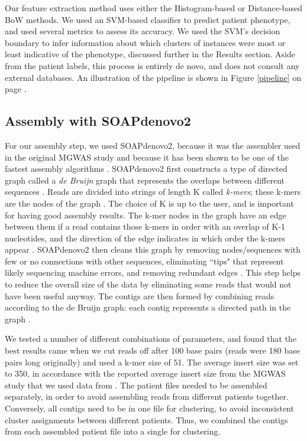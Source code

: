 Our feature extraction method uses either the Histogram-based or Distance-based BoW methods. We used an SVM-based classifier to predict patient phenotype, and used several metrics to assess its accuracy. We used the SVM's decision boundary to infer information about which clusters of instances were most or least indicative of the phenotype, discussed further in the Results section. Aside from the patient labels, this process is entirely de novo, and does not consult any external databases. An illustration of the pipeline is shown in Figure \ref{pipeline} on page \pageref{pipeline}.

\subsection{Assembly with SOAPdenovo2}

For our assembly step, we used SOAPdenovo2, because it was the assembler used in the original MGWAS study \cite{qin041012} and because it has been shown to be one of the fastest assembly algorithms \cite{peng12}. SOAPdenovo2 first constructs a type of directed graph called a \emph{de Bruijn} graph that represents the overlaps between different sequences \cite{li10}. Reads are divided into strings of length K called \emph{k-mers}; these k-mers are the nodes of the graph \cite{zerbino08}. The choice of K is up to the user, and is important for having good assembly results. The k-mer nodes in the graph have an edge between them if a read contains those k-mers in order with an overlap of K-1 nucleotides, and the direction of the edge indicates in which order the k-mers appear \cite{zerbino08}. SOAPdenovo2 then cleans this graph by removing nodes/sequences with few or no connections with other sequences, eliminating ``tips" that represent likely sequencing machine errors, and removing redundant edges \cite{li10}. This step helps to reduce the overall size of the data by eliminating some reads that would not have been useful anyway. The contigs are then formed by combining reads according to the de Bruijn graph: each contig represents a directed path in the graph \cite{zerbino08}. 

We tested a number of different combinations of parameters, and found that the best results came when we cut reads off after 100 base pairs (reads were 180 base pairs long originally) and used a k-mer size of 51. The average insert size was set to 350, in accordance with the reported average insert size from the MGWAS study that we used data from \cite{qin041012}. The patient files needed to be assembled separately, in order to avoid assembling reads from different patients together. Conversely, all contigs need to be in one file for clustering, to avoid inconsistent cluster assignments between different patients. Thus, we combined the contigs from each assembled patient file into a single for clustering.

